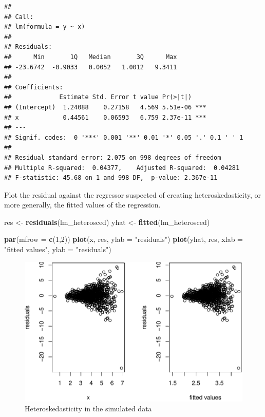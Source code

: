 \documentclass[]{book}
\newenvironment{Shaded}{\begin{snugshade}}{\end{snugshade}}
\newcommand{\DataTypeTok}[1]{\textcolor[rgb]{0.13,0.29,0.53}{#1}}
\newcommand{\DecValTok}[1]{\textcolor[rgb]{0.00,0.00,0.81}{#1}}
\newcommand{\KeywordTok}[1]{\textcolor[rgb]{0.13,0.29,0.53}{\textbf{#1}}}
\newcommand{\NormalTok}[1]{#1}
\newcommand{\StringTok}[1]{\textcolor[rgb]{0.31,0.60,0.02}{#1}}
\begin{document}
\begin{verbatim}
## 
## Call:
## lm(formula = y ~ x)
## 
## Residuals:
##      Min       1Q   Median       3Q      Max 
## -23.6742  -0.9033   0.0052   1.0012   9.3411 
## 
## Coefficients:
##             Estimate Std. Error t value Pr(>|t|)    
## (Intercept)  1.24088    0.27158   4.569 5.51e-06 ***
## x            0.44561    0.06593   6.759 2.37e-11 ***
## ---
## Signif. codes:  0 '***' 0.001 '**' 0.01 '*' 0.05 '.' 0.1 ' ' 1
## 
## Residual standard error: 2.075 on 998 degrees of freedom
## Multiple R-squared:  0.04377,    Adjusted R-squared:  0.04281 
## F-statistic: 45.68 on 1 and 998 DF,  p-value: 2.367e-11
\end{verbatim}

Plot the residual against the regressor suspected of creating
heteroskedasticity, or more generally, the fitted values of the
regression.

\begin{Shaded}
\begin{Highlighting}[]
\NormalTok{res <-}\StringTok{ }\KeywordTok{residuals}\NormalTok{(lm_heterosced)}
\NormalTok{yhat <-}\StringTok{ }\KeywordTok{fitted}\NormalTok{(lm_heterosced)}
\end{Highlighting}
\end{Shaded}

\begin{Shaded}
\begin{Highlighting}[]
\KeywordTok{par}\NormalTok{(}\DataTypeTok{mfrow =} \KeywordTok{c}\NormalTok{(}\DecValTok{1}\NormalTok{,}\DecValTok{2}\NormalTok{))}
\KeywordTok{plot}\NormalTok{(x, res, }\DataTypeTok{ylab =} \StringTok{"residuals"}\NormalTok{)}
\KeywordTok{plot}\NormalTok{(yhat, res, }\DataTypeTok{xlab =} \StringTok{"fitted values"}\NormalTok{, }\DataTypeTok{ylab =} \StringTok{"residuals"}\NormalTok{)}
\end{Highlighting}
\end{Shaded}

\begin{figure}

{\centering \includegraphics[width=0.8\linewidth]{MEM5220_R_files/figure-latex/fig10-1} 

}

\caption{Heteroskedasticity in the simulated data}\label{fig:fig10}
\end{figure}
\end{document}
